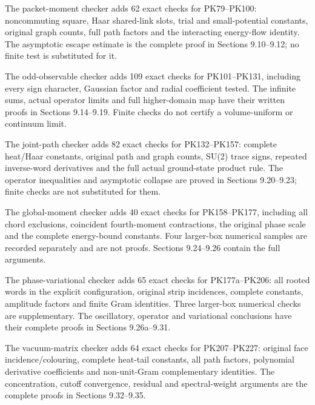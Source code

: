 \documentclass[11pt]{article}
\begin{document}
The packet-moment checker adds 62 exact checks for PK79–PK100: noncommuting square, Haar shared-link slots, trial and small-potential constants, original graph counts, full path factors and the interacting energy-flow identity. The asymptotic escape estimate is the complete proof in Sections 9.10–9.12; no finite test is substituted for it.

The odd-observable checker adds 109 exact checks for PK101–PK131, including every sign character, Gaussian factor and radial coefficient tested. The infinite sums, actual operator limits and full higher-domain map have their written proofs in Sections 9.14–9.19. Finite checks do not certify a volume-uniform or continuum limit.

The joint-path checker adds 82 exact checks for PK132–PK157: complete heat/Haar constants, original path and graph counts, SU(2) trace signs, repeated inverse-word derivatives and the full actual ground-state product rule. The operator inequalities and asymptotic collapse are proved in Sections 9.20–9.23; finite checks are not substituted for them.

The global-moment checker adds 40 exact checks for PK158–PK177, including all chord exclusions, coincident fourth-moment contractions, the original phase scale and the complete energy-bound constants. Four larger-box numerical samples are recorded separately and are not proofs. Sections 9.24–9.26 contain the full arguments.

The phase-variational checker adds 65 exact checks for PK177a–PK206: all rooted words in the explicit configuration, original strip incidences, complete constants, amplitude factors and finite Gram identities. Three larger-box numerical checks are supplementary. The oscillatory, operator and variational conclusions have their complete proofs in Sections 9.26a–9.31.

The vacuum-matrix checker adds 64 exact checks for PK207–PK227: original face incidence/colouring, complete heat-tail constants, all path factors, polynomial derivative coefficients and non-unit-Gram complementary identities. The concentration, cutoff convergence, residual and spectral-weight arguments are the complete proofs in Sections 9.32–9.35.
\end{document}
